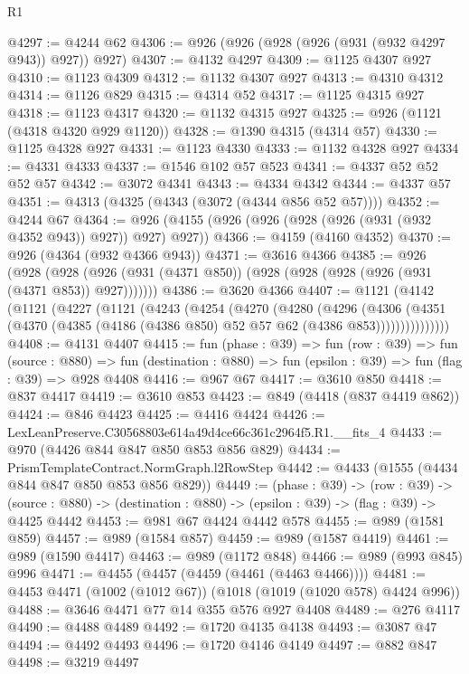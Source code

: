 \begin{lexlean}{R1}
\begin{coremodule}
@4297 := @4244 @62
@4306 := @926 (@926 (@928 (@926 (@931 (@932 @4297 @943)) @927)) @927)
@4307 := @4132 @4297
@4309 := @1125 @4307 @927
@4310 := @1123 @4309
@4312 := @1132 @4307 @927
@4313 := @4310 @4312
@4314 := @1126 @829
@4315 := @4314 @52
@4317 := @1125 @4315 @927
@4318 := @1123 @4317
@4320 := @1132 @4315 @927
@4325 := @926 (@1121 (@4318 @4320 @929 @1120))
@4328 := @1390 @4315 (@4314 @57)
@4330 := @1125 @4328 @927
@4331 := @1123 @4330
@4333 := @1132 @4328 @927
@4334 := @4331 @4333
@4337 := @1546 @102 @57 @523
@4341 := @4337 @52 @52 @52 @57
@4342 := @3072 @4341
@4343 := @4334 @4342
@4344 := @4337 @57
@4351 := @4313 (@4325 (@4343 (@3072 (@4344 @856 @52 @57))))
@4352 := @4244 @67
@4364 := @926 (@4155 (@926 (@926 (@928 (@926 (@931 (@932 @4352 @943)) @927)) @927) @927))
@4366 := @4159 (@4160 @4352)
@4370 := @926 (@4364 (@932 @4366 @943))
@4371 := @3616 @4366
@4385 := @926
    (@928 (@928 (@926 (@931 (@4371 @850)) (@928 (@928 (@928 (@926 (@931 (@4371 @853)) @927)))))))
@4386 := @3620 @4366
@4407 := @1121
    (@4142
      (@1121
        (@4227
          (@1121
            (@4243
              (@4254
                (@4270
                  (@4280
                    (@4296
                      (@4306
                        (@4351
                          (@4370 (@4385 (@4186 (@4386 @850) @52 @57 @62 (@4386 @853)))))))))))))))
@4408 := @4131 @4407
@4415 := fun (phase : @39) =>
  fun (row : @39) =>
  fun (source : @880) =>
  fun (destination : @880) => fun (epsilon : @39) => fun (flag : @39) => @928 @4408
@4416 := @967 @67
@4417 := @3610 @850
@4418 := @837 @4417
@4419 := @3610 @853
@4423 := @849 (@4418 (@837 @4419 @862))
@4424 := @846 @4423
@4425 := @4416 @4424
@4426 := LexLeanPreserve.C30568803e614a49d4ce66c361c2964f5.R1.__fits_4
@4433 := @970 (@4426 @844 @847 @850 @853 @856 @829)
@4434 := PrismTemplateContract.NormGraph.l2RowStep
@4442 := @4433 (@1555 (@4434 @844 @847 @850 @853 @856 @829))
@4449 := (phase : @39) ->
  (row : @39) ->
  (source : @880) -> (destination : @880) -> (epsilon : @39) -> (flag : @39) -> @4425 @4442
@4453 := @981 @67 @4424 @4442 @578
@4455 := @989 (@1581 @859)
@4457 := @989 (@1584 @857)
@4459 := @989 (@1587 @4419)
@4461 := @989 (@1590 @4417)
@4463 := @989 (@1172 @848)
@4466 := @989 (@993 @845) @996
@4471 := @4455 (@4457 (@4459 (@4461 (@4463 @4466))))
@4481 := @4453 @4471 (@1002 (@1012 @67)) (@1018 (@1019 (@1020 @578) @4424 @996))
@4488 := @3646 @4471 @77 @14 @355 @576 @927 @4408
@4489 := @276 @4117
@4490 := @4488 @4489
@4492 := @1720 @4135 @4138
@4493 := @3087 @47
@4494 := @4492 @4493
@4496 := @1720 @4146 @4149
@4497 := @882 @847
@4498 := @3219 @4497

\end{coremodule}
\end{lexlean}
